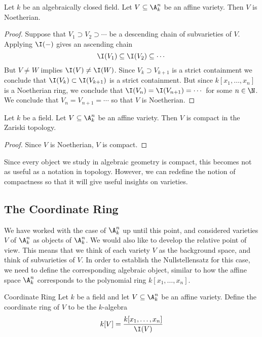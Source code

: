 \documentclass[a4paper]{article}
\begin{document}
\begin{prp}{}{} Let $k$ be an algebraically closed field. Let $V\subseteq\A_k^n$ be an affine variety. Then $V$ is Noetherian. \tcbline
\begin{proof}
Suppose that $V_1\supset V_2\supset\cdots$ be a descending chain of subvarieties of $V$. Applying $\I(-)$ gives an ascending chain $$\I(V_1)\subseteq\I(V_2)\subseteq\cdots$$ But $V\neq W$ implies $\I(V)\neq\I(W)$. Since $V_k\supset V_{k+1}$ is a strict containment we conclude that $\I(V_k)\subset\I(V_{k+1})$ is a strict containment. But since $k[x_1,\dots,x_n]$ is a Noetherian ring, we conclude that $\I(V_n)=\I(V_{n+1})=\cdots$ for some $n\in\N$. We conclude that $V_n=V_{n+1}=\cdots$ so that $V$ is Noetherian. 
\end{proof}
\end{prp}

\begin{crl}{}{} Let $k$ be a field. Let $V\subseteq\A_k^n$ be an affine variety. Then $V$ is compact in the Zariski topology. \tcbline
\begin{proof}
Since $V$ is Noetherian, $V$ is compact. 
\end{proof}
\end{crl}

Since every object we study in algebraic geometry is compact, this becomes not as useful as a notation in topology. However, we can redefine the notion of compactness so that it will give useful insights on varieties. 

\subsection{The Coordinate Ring}
We have worked with the case of $\A_k^n$ up until this point, and considered varieties $V$ of $\A_k^n$  as objects of $\A_k^n$. We would also like to develop the relative point of view. This means that we think of each variety $V$ as the background space, and think of subvarieties of $V$. In order to establish the Nullstellensatz for this case, we need to define the corresponding algebraic object, similar to how the affine space $\A_k^n$ corresponds to the polynomial ring $k[x_1,\dots,x_n]$. 

\begin{defn}{Coordinate Ring}{} Let $k$ be a field and let $V\subseteq\A_k^n$ be an affine variety. Define the coordinate ring of $V$ to be the $k$-algebra $$k[V]=\frac{k[x_1,\dots,x_n]}{\I(V)}$$
\end{defn}
\end{document}
